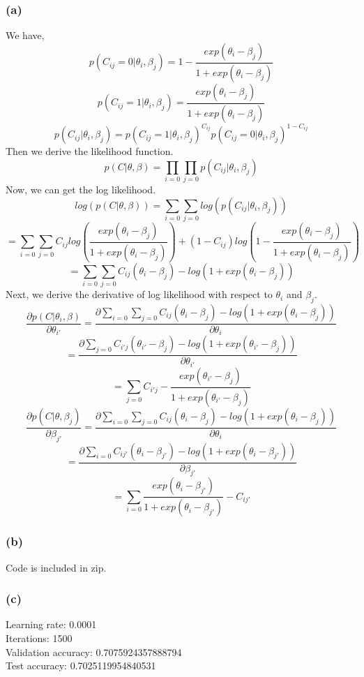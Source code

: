 \documentclass{article}
\begin{document}
\subsubsection{(a)}
We have,
$$
p(C_{ij} = 0|\theta_i, \beta_j) = 1 - \frac{exp(\theta_i - \beta_j)}{ 1 + exp(\theta_i - \beta_j)} 
$$
$$
p(C_{ij} = 1|\theta_i, \beta_j) = \frac{exp(\theta_i - \beta_j)}{ 1 + exp(\theta_i - \beta_j)} 
$$
$$
p(C_{ij}|\theta_i, \beta_j) = p(C_{ij} = 1|\theta_i, \beta_j)^{C_{ij}} p(C_{ij} = 0|\theta_i, \beta_j)^{1-C_{ij}}
$$
Then we derive the likelihood function.
$$
p(C|\theta, \beta) = \prod_{i = 0} \prod_{j = 0} p(C_{ij}|\theta_i, \beta_j)
$$
Now, we can get the log likelihood.
$$
log(p(C|\theta, \beta)) = \sum_{i = 0} \sum_{j = 0} log(p(C_{ij}|\theta_i, \beta_j))
$$
$$
= \sum_{i = 0} \sum_{j = 0} C_{ij}log(\frac{exp(\theta_i - \beta_j)}{ 1 + exp(\theta_i - \beta_j)}) + (1 - C_{ij})log(1-\frac{exp(\theta_i - \beta_j)}{ 1 + exp(\theta_i - \beta_j)})
$$
$$
= \sum_{i = 0} \sum_{j = 0} C_{ij}(\theta_i - \beta_j) - log(1+exp(\theta_i - \beta_j))
$$
Next, we derive the derivative of log likelihood with respect to $\theta_i$ and $\beta_j$.
$$
\frac{\partial p(C|\theta_i, \beta)}{\partial \theta_{i'}} = \frac{\partial \sum_{i = 0} \sum_{j = 0} C_{ij}(\theta_{i} - \beta_j) - log(1+exp(\theta_{i} - \beta_j))}{\partial \theta_{i}}
$$
$$
= \frac{\partial \sum_{j = 0} C_{i'j}(\theta_{i'} - \beta_j) - log(1+exp(\theta_{i'} - \beta_j))}{\partial \theta_{i'}}
$$
$$
= \sum_{j = 0}  C_{i'j} - \frac{exp(\theta_{i'} - \beta_j)}{ 1 + exp(\theta_{i'} - \beta_j)} 
$$
$$
\frac{\partial p(C|\theta, \beta_j)}{\partial \beta_{j'}} = \frac{\partial \sum_{i = 0} \sum_{j = 0} C_{ij}(\theta_{i} - \beta_j) - log(1+exp(\theta_{i} - \beta_j))}{\partial \theta_{i}}
$$
$$
= \frac{\partial \sum_{i = 0} C_{ij'}(\theta_i - \beta_{j'}) - log(1+exp(\theta_i - \beta_{j'}))}{\partial \beta_{j'}}
$$
$$
= \sum_{i = 0} \frac{exp(\theta_i - \beta_{j'})}{ 1 + exp(\theta_i - \beta_{j'})}- C_{ij'} 
$$
\subsubsection{(b)}
Code is included in zip.

\subsubsection{(c)}
Learning rate: 0.0001\\
Iterations: 1500\\
Validation accuracy: 0.7075924357888794\\
Test accuracy: 0.7025119954840531\\
\end{document}
